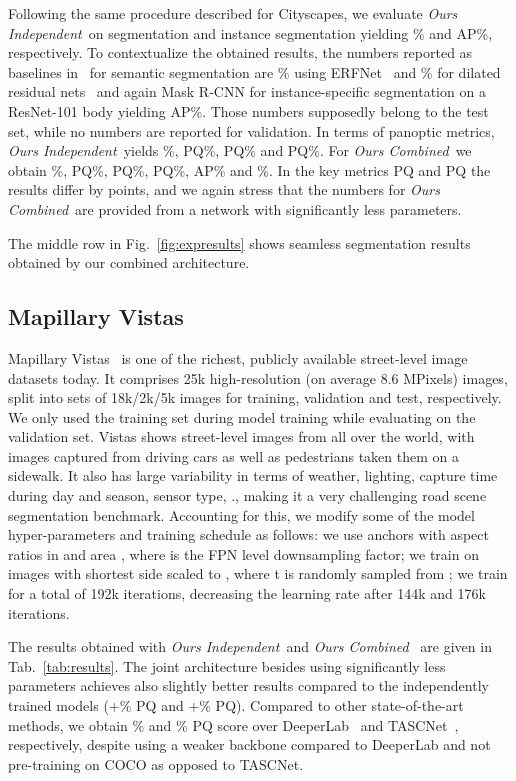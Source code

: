 \documentclass[10pt,twocolumn,letterpaper]{article}
\newcommand{\indep}{\emph{Ours Independent}\xspace}
\newcommand{\joint}{\emph{Ours Combined}\xspace}
\begin{document}
Following the same procedure described for Cityscapes, we evaluate \indep~on segmentation and instance segmentation yielding \% and AP\%, respectively. To contextualize the obtained results, the numbers reported as baselines in~\cite{Varma19} for semantic segmentation are \% using ERFNet~\cite{Romera18} and \% for dilated residual nets~\cite{Yu_2017_CVPR} and again Mask R-CNN for instance-specific segmentation on a ResNet-101 body yielding AP\%. Those numbers supposedly belong to the test set, while no numbers are reported for validation. In terms of panoptic metrics, \indep~yields \%, PQ\%, PQ\% and PQ\%. For \joint~we obtain \%, PQ\%, PQ\%, PQ\%, AP\% and \%. In the key metrics PQ and PQ the results differ by  points, and we again stress that the numbers for \joint~are provided from a network with significantly less parameters.




The middle row in Fig.~\ref{fig:expresults} shows seamless segmentation results obtained by our combined architecture.

\subsection{Mapillary Vistas}\label{ssec:vistas}
Mapillary Vistas~\cite{Neuhold2017} is one of the richest, publicly available street-level image datasets today. It comprises 25k high-resolution (on average 8.6 MPixels) images, split into sets of 18k/2k/5k images for training, validation and test, respectively. We only used the training set during model training while evaluating on the validation set. Vistas shows street-level images from all over the world, with images captured from driving cars as well as pedestrians taken them on a sidewalk. It also has large variability in terms of weather, lighting, capture time during day and season, sensor type, \etc., making it a very challenging road scene segmentation benchmark.
Accounting for this, we modify some of the model hyper-parameters and training schedule as follows: we use anchors with aspect ratios in  and area , where  is the FPN level downsampling factor; we train on images with shortest side scaled to , where t is randomly sampled from ; we train for a total of 192k iterations, decreasing the learning rate after 144k and 176k iterations.

The results obtained with \indep~and \joint~ are given in Tab.~\ref{tab:results}. The joint architecture besides using significantly less parameters achieves also slightly better results compared to the independently trained models (+\% PQ and +\% PQ). Compared to other state-of-the-art methods, we obtain \% and \% PQ score over DeeperLab~\cite{Yang_Google_2019} and TASCNet~\cite{Li2018}, respectively, despite using a weaker backbone compared to DeeperLab and not pre-training on COCO as opposed to TASCNet. 
\end{document}
